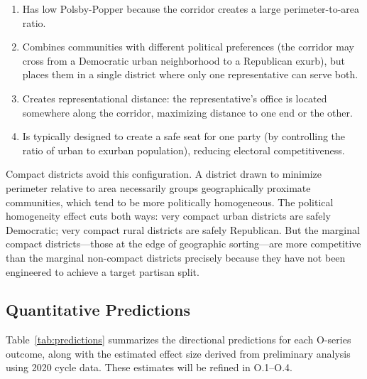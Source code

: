 \begin{enumerate}
\item Has low Polsby-Popper because the corridor creates a large perimeter-to-area ratio.
\item Combines communities with different political preferences (the corridor may cross
  from a Democratic urban neighborhood to a Republican exurb), but places them in a
  single district where only one representative can serve both.
\item Creates representational distance: the representative's office is located somewhere
  along the corridor, maximizing distance to one end or the other.
\item Is typically designed to create a safe seat for one party (by controlling the ratio
  of urban to exurban population), reducing electoral competitiveness.
\end{enumerate}

Compact districts avoid this configuration. A district drawn to minimize perimeter
relative to area necessarily groups geographically proximate communities, which tend
to be more politically homogeneous. The political homogeneity effect cuts both ways:
very compact urban districts are safely Democratic; very compact rural districts are
safely Republican. But the marginal compact districts---those at the edge of geographic
sorting---are more competitive than the marginal non-compact districts precisely because
they have not been engineered to achieve a target partisan split.

\subsection{Quantitative Predictions}

Table~\ref{tab:predictions} summarizes the directional predictions for each O-series
outcome, along with the estimated effect size derived from preliminary analysis using
2020 cycle data. These estimates will be refined in O.1--O.4.

